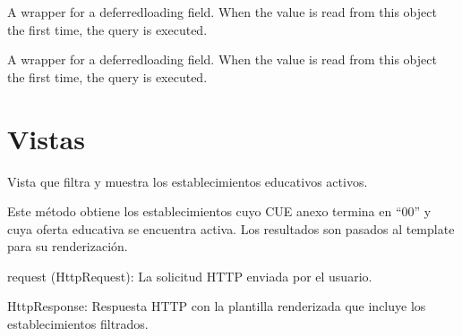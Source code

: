 \documentclass[letterpaper,10pt,spanish]{sphinxmanual}
\begin{document}
\begin{fulllineitems}
\begin{fulllineitems}
\pysigstartsignatures
{}
\pysigstopsignatures
\sphinxAtStartPar
A wrapper for a deferred\sphinxhyphen{}loading field. When the value is read from this
object the first time, the query is executed.

\end{fulllineitems}



\begin{fulllineitems}

\pysigstartsignatures
{}
\pysigstopsignatures
\sphinxAtStartPar
A wrapper for a deferred\sphinxhyphen{}loading field. When the value is read from this
object the first time, the query is executed.

\end{fulllineitems}


\end{fulllineitems}



\section{Vistas}
\label{\detokenize{establecimientos:vistas}}

\begin{fulllineitems}

\pysigstartsignatures
{}
\pysigstopsignatures
\sphinxAtStartPar
Vista que filtra y muestra los establecimientos educativos activos.

\sphinxAtStartPar
Este método obtiene los establecimientos cuyo CUE anexo termina en “00” y cuya oferta educativa
se encuentra activa. Los resultados son pasados al template 
para su renderización.
\begin{description}
\sphinxAtStartPar
request (HttpRequest): La solicitud HTTP enviada por el usuario.

\sphinxAtStartPar
HttpResponse: Respuesta HTTP con la plantilla renderizada que incluye los establecimientos filtrados.

\end{description}

\end{fulllineitems}
\end{document}
